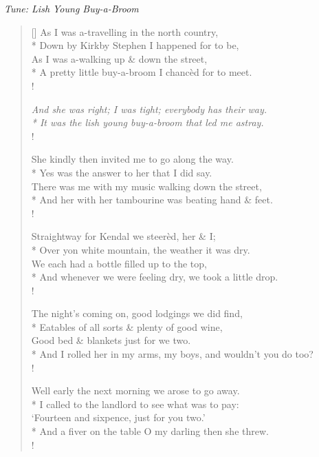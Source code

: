 \documentclass[MAIN]{subfiles}
\begin{document}
\bigskip

\begin{center}
{\it Tune: Lish Young Buy-a-Broom}
\end{center}

\bigskip

\settowidth{\versewidth}{A pretty little buy-a-broom I chanc\`ed for to meet.}
\begin{verse}[\versewidth]
As I was a-travelling in the north country,\\*
Down by {\sc Kirkby Stephen} I happened for to be,\\
As I was a-walking up \& down the street,\\*
A pretty little buy-a-broom I chanc\`ed for to meet.\\!

{\it And she was right; I was tight; everybody has their way.\\*
It was the lish young buy-a-broom that led me astray.}\\!

She kindly then invited me to go along the way.\\*
Yes was the answer to her that I did say.\\
There was me with my music walking down the street,\\*
And her with her tambourine was beating hand \& feet.\\!

Straightway for {\sc Kendal} we steer\`ed, her \& I;\\*
Over yon white mountain, the weather it was dry.\\
We each had a bottle filled up to the top,\\*
And whenever we were feeling dry, we took a little drop.\\!

The night's coming on, good lodgings we did find,\\*
Eatables of all sorts \& plenty of good wine,\\
Good bed \& blankets just for we two.\\*
And I rolled her in my arms, my boys, and wouldn't you do too?\\!

Well early the next morning we arose to go away.\\*
I called to the landlord to see what was to pay:\\
`Fourteen and sixpence, just for you two.'\\*
And a fiver on the table O my darling then she threw.\\!


\end{verse}
\end{document}
